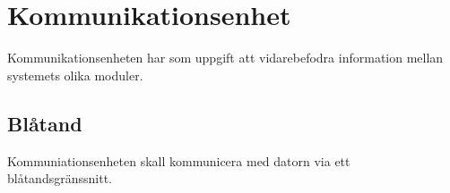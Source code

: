 \section{Kommunikationsenhet}
Kommunikationsenheten har som uppgift att vidarebefodra information mellan
systemets olika moduler.

\subsection{Blåtand}
Kommuniationsenheten skall kommunicera med datorn via ett blåtandsgränssnitt. 

